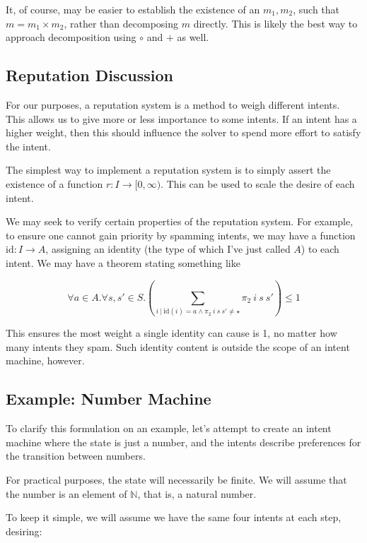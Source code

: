 It, of course, may be easier to establish the existence of an $m_1, m_2$, such that $m = m_1 \times m_2$, rather than decomposing $m$ directly. This is likely the best way to approach decomposition using $\circ$ and $+$ as well.

\subsection{Reputation Discussion}

For our purposes, a reputation system is a method to weigh different intents. This allows us to give more or less importance to some intents. If an intent has a higher weight, then this should influence the solver to spend more effort to satisfy the intent.

The simplest way to implement a reputation system is to simply assert the existence of a function $r : I \rightarrow [0, \infty)$. This can be used to scale the desire of each intent.

We may seek to verify certain properties of the reputation system. For example, to ensure one cannot gain priority by spamming intents, we may have a function $\text{id} : I \rightarrow A$, assigning an identity (the type of which I've just called $A$) to each intent. We may have a theorem stating something like

\begin{equation}
    \forall a \in A. \forall s, s' \in S. \left( \sum_{i\ |\ \text{id}(i) = a \wedge \pi_2\ i\ s\ s' \neq \star} \pi_2\ i\ s\ s' \right) \leq 1
\end{equation}

This ensures the most weight a single identity can cause is 1, no matter how many intents they spam. Such identity content is outside the scope of an intent machine, however.

\subsection{Example: Number Machine}

To clarify this formulation on an example, let's attempt to create an intent machine where the state is just a number, and the intents describe preferences for the transition between numbers.

For practical purposes, the state will necessarily be finite. We will assume that the number is an element of $\mathbb{N}$, that is, a natural number.

To keep it simple, we will assume we have the same four intents at each step, desiring:

